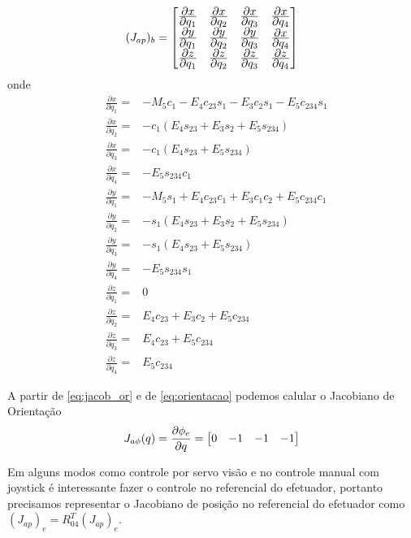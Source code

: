 \begin{equation}
({J}_{ap})_b = 
\begin{bmatrix}
	\frac{\displaystyle \partial x}{\displaystyle \partial q_1} & \frac{\displaystyle \partial x}{\displaystyle \partial q_2} & \frac{\displaystyle \partial x}{\displaystyle \partial q_3} & \frac{\displaystyle \partial x}{\displaystyle \partial q_4}  \\
	\frac{\displaystyle \partial y}{\displaystyle \partial q_1} & \frac{\displaystyle \partial y}{\displaystyle \partial q_2} & \frac{\displaystyle \partial y}{\displaystyle \partial q_3} & \frac{\displaystyle \partial x}{\displaystyle \partial q_4}  \\
	\frac{\displaystyle \partial z}{\displaystyle \partial q_1} & \frac{\displaystyle \partial z}{\displaystyle \partial q_2} & \frac{\displaystyle \partial z}{\displaystyle \partial q_3} & \frac{\displaystyle \partial z}{\displaystyle \partial q_4}  \\
\end{bmatrix}
\end{equation}
onde
\begin{align*}
&\frac{\partial x}{\partial q_1} =& - M_5c_1 - E_4c_{23}s_1 - E_3c_2s_1 - E_5c_{234}s_1  \\
&\frac{\partial x}{\partial q_2} =& -c_1(E_4s_{23}+E_3s_2+E_5s_{234}) \\
&\frac{\partial x}{\partial q_3} =& -c_1(E_4s_{23}+E_5s_{234}) \\
&\frac{\partial x}{\partial q_4} =& -E_5s_{234}c_1 \\
&\frac{\partial y}{\partial q_1} =& -M_5s_1+E_4c_{23}c_1+E_3c_1c_2+E_5c_{234}c_1 \\
&\frac{\partial y}{\partial q_2} =& -s_1(E_4s_{23}+E_3s_2+E_5s_{234}) \\
&\frac{\partial y}{\partial q_3} =& -s_1(E_4s_{23}+E_5s_{234}) \\
&\frac{\partial y}{\partial q_4} =& -E_5s_{234}s_1 \\ 
&\frac{\partial z}{\partial q_1} =& 0 \\ 
&\frac{\partial z}{\partial q_2} =& E_4c_{23}+E_3c_2+E_5c_{234} \\
&\frac{\partial z}{\partial q_3} =& E_4c_{23}+E_5c_{234}\\
&\frac{\partial z}{\partial q_4} =& E_{5}c_{234} 
\end{align*}

A partir de \ref{eq:jacob_or} e de \ref{eq:orientacao} podemos calular o Jacobiano de Orientação
\begin{equation}
{J}_{a\phi}({q}) = \frac{\partial \phi_e}{\partial {q}} = \begin{bmatrix}0 & -1 & -1 & -1\end{bmatrix}
\end{equation}
 
Em alguns modos como controle por servo visão e no controle manual com joystick é interessante fazer o controle no referencial do efetuador, portanto precisamos representar o Jacobiano de posição no referencial do efetuador como $({J}_{ap})_e = {R}_{04}^T ({J}_{ap})_e$.  

